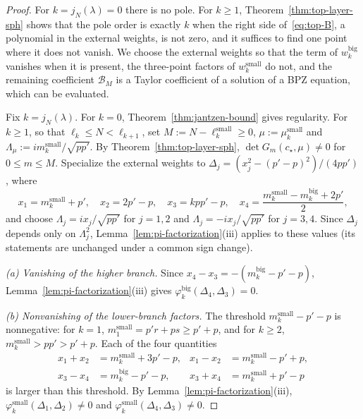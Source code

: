 \documentclass[twoside,10pt]{article}
\numberwithin{equation}{section}
\theoremstyle{slbody}
\theoremstyle{definition}
\theoremstyle{remark}
\begin{document}
\begin{proof}
For \(k=j_N(\lambda)=0\) there is no pole.  For \(k\geq1\),
Theorem~\ref{thm:top-layer-sph} shows that the pole order is exactly \(k\) when
the right side of~\eqref{eq:top-B}, a polynomial in the external weights, is
not zero, and it suffices to find one point where it does not vanish.  We
choose the external weights so that the term of \(w^{\mathrm{big}}_k\)
vanishes when it is present, the three-point factors of
\(w^{\mathrm{small}}_k\) do not, and the remaining coefficient
\(\mathcal B_M\) is a Taylor coefficient of a solution of a BPZ equation, which
can be evaluated.

Fix \(k=j_N(\lambda)\).  For \(k=0\), Theorem~\ref{thm:jantzen-bound} gives
regularity.  For \(k\geq1\), so that \(\ell_k\leq N<\ell_{k+1}\), set
\(M:=N-\ell^{\mathrm{small}}_k\geq0\), \(\mu:=\mu^{\mathrm{small}}_k\) and
\(\Lambda_\mu:=im^{\mathrm{small}}_k/\sqrt{pp'}\).
By Theorem~\ref{thm:top-layer-sph}, \(\det G_m(c_\star,\mu)\neq0\) for
\(0\leq m\leq M\).  Specialize the external weights to
\(\Delta_j=(x_j^2-(p'-p)^2)/(4pp')\), where
\[
 x_1=m^{\mathrm{small}}_k+p',\quad
 x_2=2p'-p,\quad
 x_3=kpp'-p,\quad
 x_4=\frac{m^{\mathrm{small}}_k-m^{\mathrm{big}}_k+2p'}{2},
\]
and choose \(\Lambda_j=ix_j/\sqrt{pp'}\) for \(j=1,2\) and
\(\Lambda_j=-ix_j/\sqrt{pp'}\) for \(j=3,4\).  Since \(\Delta_j\) depends only
on \(\Lambda_j^2\), Lemma~\ref{lem:pi-factorization}(iii) applies to these
values (its statements are unchanged under a common sign change).

\emph{(a) Vanishing of the higher branch.}  Since
\(x_4-x_3=-(m^{\mathrm{big}}_k-p'-p)\), Lemma~\ref{lem:pi-factorization}(iii)
gives \(\varphi^{\mathrm{big}}_k(\Delta_4,\Delta_3)=0\).

\emph{(b) Nonvanishing of the lower-branch factors.}  The threshold
\(m^{\mathrm{small}}_k-p'-p\) is nonnegative: for \(k=1\),
\(m^{\mathrm{small}}_1=p'r+ps\geq p'+p\), and for \(k\geq2\),
\(m^{\mathrm{small}}_k>pp'>p'+p\).  Each of the four quantities
\begin{align*}
 x_1+x_2&=m^{\mathrm{small}}_k+3p'-p,&
 x_1-x_2&=m^{\mathrm{small}}_k-p'+p,\\
 x_3-x_4&=m^{\mathrm{big}}_k-p'-p,&
 x_3+x_4&=m^{\mathrm{small}}_k+p'-p
\end{align*}
is larger than this threshold.  By Lemma~\ref{lem:pi-factorization}(iii),
\(\varphi^{\mathrm{small}}_k(\Delta_1,\Delta_2)\neq0\) and
\(\varphi^{\mathrm{small}}_k(\Delta_4,\Delta_3)\neq0\).


\end{proof}
\end{document}
